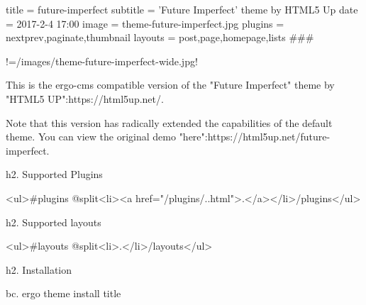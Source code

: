 title = future-imperfect
subtitle = 'Future Imperfect' theme by HTML5 Up
date = 2017-2-4 17:00
image = theme-future-imperfect.jpg
plugins = nextprev,paginate,thumbnail
layouts = post,page,homepage,lists
###

!=/images/theme-future-imperfect-wide.jpg!

This is the ergo-cms compatible version of the "Future Imperfect" theme by "HTML5 UP":https://html5up.net/.

Note that this version has radically extended the capabilities of the default theme. You can view the original demo "here":https://html5up.net/future-imperfect.

h2. Supported Plugins

<ul>{{#plugins @split}}<li><a href="/plugins/{{.}}.html">{{.}}</a></li>{{/plugins}}</ul>

h2. Supported layouts

<ul>{{#layouts @split}}<li>{{.}}</li>{{/layouts}}</ul>

h2. Installation

bc. ergo theme install {{title}}





